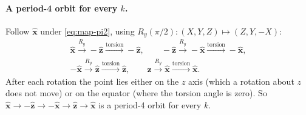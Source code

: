 \documentclass[11pt,a4paper]{article}
\begin{document}
\paragraph{A period-4 orbit for every $k$.} Follow $\hat{\bm x}$ under \eqref{eq:map-pi2}, using $R_y(\pi/2):
(X,Y,Z)\mapsto(Z,Y,-X)$:
\begin{gather*}
  \hat{\bm x} \xrightarrow{R_y} -\hat{\bm z} \xrightarrow{\text{torsion}} -\hat{\bm z}, \qquad
  -\hat{\bm z} \xrightarrow{R_y} -\hat{\bm x} \xrightarrow{\text{torsion}} -\hat{\bm x}, \\
  -\hat{\bm x} \xrightarrow{R_y} \hat{\bm z} \xrightarrow{\text{torsion}} \hat{\bm z}, \qquad
  \hat{\bm z} \xrightarrow{R_y} \hat{\bm x} \xrightarrow{\text{torsion}} \hat{\bm x}.
\end{gather*}
After each rotation the point lies either on the $z$ axis (which a rotation about $z$ does not move) or on the
equator (where the torsion angle is zero). So $\hat{\bm x} \to -\hat{\bm z} \to -\hat{\bm x} \to \hat{\bm z} \to
\hat{\bm x}$ is a period-4 orbit for every $k$.
\end{document}
